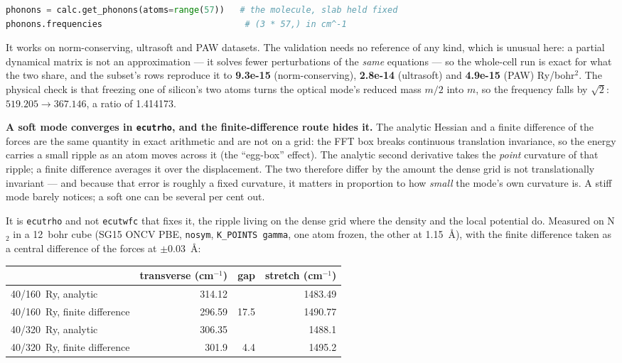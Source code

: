 \documentclass[11pt,a4paper]{article}
\newcommand{\code}[1]{\texttt{\small #1}}
\begin{document}
\begin{lstlisting}[language=Python]
phonons = calc.get_phonons(atoms=range(57))   # the molecule, slab held fixed
phonons.frequencies                            # (3 * 57,) in cm^-1
\end{lstlisting}

\noindent It works on norm-conserving, ultrasoft and PAW datasets. The
validation needs no reference of any kind, which is unusual here: a partial
dynamical matrix is not an approximation --- it solves fewer perturbations of
the \emph{same} equations --- so the whole-cell run is exact for what the two
share, and the subset's rows reproduce it to \textbf{9.3e-15} (norm-conserving),
\textbf{2.8e-14} (ultrasoft) and \textbf{4.9e-15} (PAW) Ry/bohr$^2$. The
physical check is that freezing one of silicon's two atoms turns the optical
mode's reduced mass $m/2$ into $m$, so the frequency falls by $\sqrt2$:
$519.205 \to 367.146$, a ratio of 1.414173.

\textbf{A soft mode converges in \code{ecutrho}, and the finite-difference
route hides it.} The analytic Hessian and a finite difference of the forces are
the same quantity in exact arithmetic and are not on a grid: the FFT box breaks
continuous translation invariance, so the energy carries a small ripple as an
atom moves across it (the ``egg-box'' effect). The analytic second derivative
takes the \emph{point} curvature of that ripple; a finite difference averages it
over the displacement. The two therefore differ by the amount the dense grid is
not translationally invariant --- and because that error is roughly a fixed
curvature, it matters in proportion to how \emph{small} the mode's own curvature
is. A stiff mode barely notices; a soft one can be several per cent out.

It is \code{ecutrho} and not \code{ecutwfc} that fixes it, the ripple living on
the dense grid where the density and the local potential do. Measured on
N$_2$ in a 12~bohr cube (SG15 ONCV PBE, \code{nosym}, \code{K\_POINTS gamma},
one atom frozen, the other at 1.15~\AA), with the finite difference taken as a
central difference of the forces at $\pm0.03$~\AA:

\begin{center}
\begin{tabular}{lrrr}
\toprule
 & transverse (cm$^{-1}$) & gap & stretch (cm$^{-1}$) \\
\midrule
40/160~Ry, analytic          & 314.12 &        & 1483.49 \\
40/160~Ry, finite difference & 296.59 & 17.5   & 1490.77 \\
40/320~Ry, analytic          & 306.35 &        & 1488.1 \\
40/320~Ry, finite difference & 301.9  & \phantom{0}4.4 & 1495.2 \\
\bottomrule
\end{tabular}
\end{center}
\end{document}
